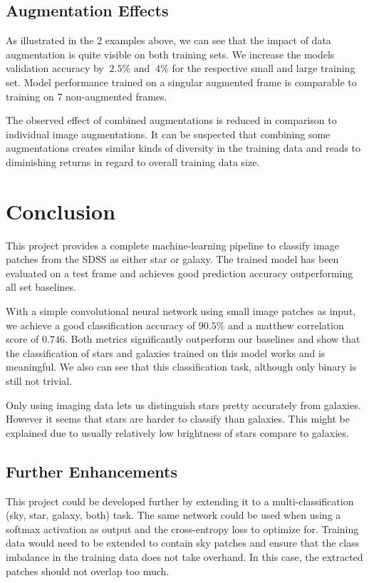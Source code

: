 \documentclass[
a4paper,     %
10pt         %
]{scrartcl}  %
\begin{document}
\subsection{Augmentation Effects}
As illustrated in the 2 examples above, we can see that the impact of data augmentation is quite visible on both training sets.
We increase the models validation accuracy by $~2.5\%$ and $~4\%$ for the respective small and large training set.
Model performance trained on a singular augmented frame is comparable to training on 7 non-augmented frames.

The observed effect of combined augmentations is reduced in comparison to individual image augmentations.
It can be suspected that combining some augmentations creates similar kinds of diversity in the training data and reads to diminishing returns in regard to overall training data size.

\section{Conclusion}
This project provides a complete machine-learning pipeline to classify image patches from the SDSS as either star or galaxy.
The trained model has been evaluated on a test frame and achieves good prediction accuracy outperforming all set baselines.

With a simple convolutional neural network using small image patches as input, we achieve a good classification accuracy of $90.5\%$
and a matthew correlation score of $0.746$.
Both metrics significantly outperform our baselines and show that the classification of stars and galaxies trained on this model works and is meaningful.
We also can see that this classification task, although only binary is still not trivial.

Only using imaging data lets us distinguish stars pretty accurately from galaxies.
However it seems that stars are harder to classify than galaxies.
This might be explained due to usually relatively low brightness of stars compare to galaxies.

\subsection{Further Enhancements}
This project could be developed further by extending it to a multi-classification (sky, star, galaxy, both) task.
The same network could be used when using a softmax activation as output and the cross-entropy loss to optimize for.
Training data would need to be extended to contain sky patches and ensure that the class imbalance in the training data does not take overhand.
In this case, the extracted patches should not overlap too much.
\end{document}

